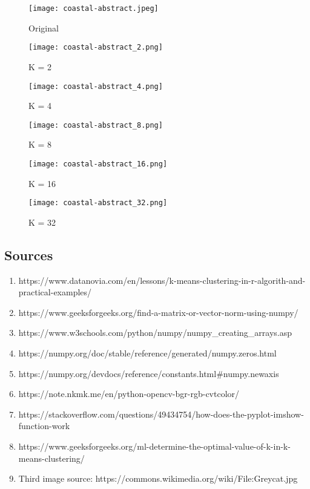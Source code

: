 \documentclass{article}
\begin{document}
\begin{figure}[H]
    \centering
    \texttt{[image: coastal-abstract.jpeg]}
    \caption{Original}
\end{figure}

\begin{figure}[H]
    \centering
    \texttt{[image: coastal-abstract\_2.png]}
    \caption{K = 2}
\end{figure}

\begin{figure}[H]
    \centering
    \texttt{[image: coastal-abstract\_4.png]}
    \caption{K = 4}
\end{figure}

\begin{figure}[H]
    \centering
    \texttt{[image: coastal-abstract\_8.png]}
    \caption{K = 8}
\end{figure}

\begin{figure}[H]
    \centering
    \texttt{[image: coastal-abstract\_16.png]}
    \caption{K = 16}
\end{figure}

\begin{figure}[H]
    \centering
    \texttt{[image: coastal-abstract\_32.png]}
    \caption{K = 32}
\end{figure}

\subsection*{Sources}

\begin{enumerate}
\item https://www.datanovia.com/en/lessons/k-means-clustering-in-r-algorith-and-practical-examples/
\item https://www.geeksforgeeks.org/find-a-matrix-or-vector-norm-using-numpy/
\item https://www.w3schools.com/python/numpy/numpy\_creating\_arrays.asp
\item https://numpy.org/doc/stable/reference/generated/numpy.zeros.html
\item https://numpy.org/devdocs/reference/constants.html\#numpy.newaxis
\item https://note.nkmk.me/en/python-opencv-bgr-rgb-cvtcolor/
\item https://stackoverflow.com/questions/49434754/how-does-the-pyplot-imshow-function-work
\item https://www.geeksforgeeks.org/ml-determine-the-optimal-value-of-k-in-k-means-clustering/
\item Third image source: https://commons.wikimedia.org/wiki/File:Greycat.jpg

\end{enumerate}
\end{document}
